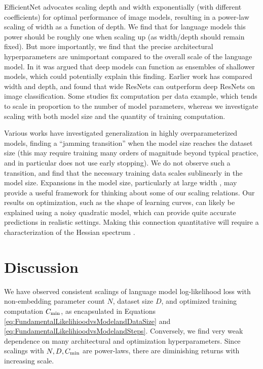 EfficientNet \cite{DBLP:journals/corr/abs-1905-11946}   advocates scaling depth and width exponentially (with different coefficients) for optimal performance of image models, resulting in a power-law scaling of width as a function of depth.    We find that for language models this power should be roughly one when scaling up (as width/depth should remain fixed). But more importantly, we find that the precise architectural hyperparameters are unimportant compared to the overall scale of the language model.  In \cite{ResNetsEnsemblesShallow} it was argued that deep models can function as ensembles of shallower models, which could potentially explain this finding.  Earlier work  \cite{Zagoruyko_2016} has compared width and depth, and found that wide ResNets can outperform deep ResNets on image classification. Some studies fix computation per data example, which tends to scale in proportion to the number of model parameters, whereas we investigate scaling with both model size and the quantity of training computation. 

Various works \cite{1710.03667,1812.11118} have investigated generalization in highly overparameterized models, finding a ``jamming transition'' \cite{1901.01608} when the model size reaches the dataset size (this may  require training many orders of magnitude beyond typical practice, and in particular does not use early stopping).  We do not observe such a transition, and find that the necessary training data scales sublinearly in the model size. Expansions in the model size, particularly at large width \cite{jacot2018neural, 1902.06720}, may provide a useful framework for thinking about some of our scaling relations.  Our results on optimization, such as the shape of learning curves, can likely be explained using a noisy quadratic model, which can provide quite accurate predictions \cite{DBLP:journals/corr/abs-1907-04164} in realistic settings.  Making this connection quantitative will require a characterization of the Hessian spectrum \cite{DBLP:journals/corr/abs-1811-07062, DBLP:journals/corr/abs-1901-10159, unpublished-grd}.

\section{Discussion}

We have observed consistent scalings of language model log-likelihood loss with non-embedding parameter count $N$, dataset size $D$, and optimized training computation $C_{\rm min}$, as encapsulated in Equations \eqref{eq:FundamentalLikelihioodvsModelandDataSize} and \eqref{eq:FundamentalLikelihioodvsModelandSteps}.  Conversely, we find very weak dependence on many architectural and optimization hyperparameters.  Since scalings with $N, D, C_{\rm min}$ are power-laws, there are diminishing returns with increasing scale.

